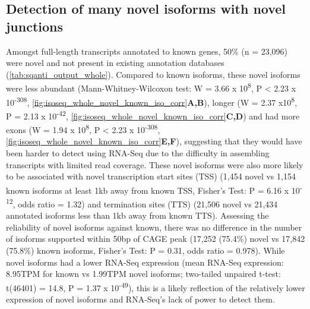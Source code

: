 \subsection{Detection of many novel isoforms with novel junctions}
\label{sec:whole_novelIso}
Amongst full-length transcripts annotated to known genes, 50\% (n = 23,096) were novel and not present in existing annotation databases (\cref{tab:sqanti_output_whole}). Compared to known isoforms, these novel isoforms were less abundant (Mann-Whitney-Wilcoxon test: W = 3.66 x 10\textsuperscript{8}, P < 2.23 x 10\textsuperscript{-308}, \cref{fig:isoseq_whole_novel_known_iso_corr}\textbf{A,B}), longer (W = 2.37 x10\textsuperscript{8}, P = 2.13 x 10\textsuperscript{-42}, \cref{fig:isoseq_whole_novel_known_iso_corr}\textbf{C,D}) and had more exons (W = 1.94 x 10\textsuperscript{8}, P < 2.23 x 10\textsuperscript{-308}, \cref{fig:isoseq_whole_novel_known_iso_corr}\textbf{E,F}), suggesting that they would have been harder to detect using RNA-Seq due to the difficulty in assembling transcripts with limited read coverage. These novel isoforms were also more likely to be associated with novel transcription start sites (TSS) (1,454 novel vs 1,154 known isoforms at least 1kb away from known TSS, Fisher's Test: P = 6.16 x 10\textsuperscript{-12}, odds ratio = 1.32) and termination sites (TTS) (21,506 novel vs 21,434 annotated isoforms less than 1kb away from known TTS). Assessing the reliability of novel isoforms against known, there was no difference in the number of isoforms supported within 50bp of CAGE peak (17,252 (75.4\%) novel vs 17,842 (75.8\%) known isoforms, Fisher's Test: P = 0.31, odds ratio = 0.978). While novel isoforms had a lower RNA-Seq expression (mean RNA-Seq expression: 8.95TPM for known vs 1.99TPM novel isoforms; two-tailed unpaired t-test: t(46401) = 14.8, P = 1.37 x 10\textsuperscript{-49}), this is a likely reflection of the relatively lower expression of novel isoforms and RNA-Seq's lack of power to detect them.

